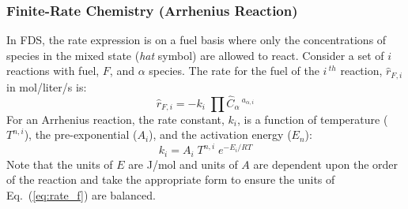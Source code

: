 \subsubsection{Finite-Rate Chemistry (Arrhenius Reaction)}
In FDS, the rate expression is on a fuel basis where only the concentrations of species in the mixed state ({\em hat} symbol) are allowed to react. Consider a set of $i$ reactions with fuel, $F$, and $\alpha$ species. The rate for the fuel of the $i\,^{th}$ reaction, $\hat{r}_{F,i}$ in mol/liter/s is:
\begin{equation}\label{eq:rate_f}
\hat{r}_{F,i}= -k_{i}\; \prod \hat{C}_{\alpha}\,^{a_{\alpha,i}}
\end{equation}
For an Arrhenius reaction, the rate constant, $k_{i}$, is a function of temperature ($T^{n,i}$), the pre-exponential ($A_{i}$), and the activation energy ($E_{n}$):
\begin{equation}\label{eq:rate_cons}
k_{i} = A_{i}\;T^{n,i}\;e^{-E_{i}/RT} 
\end{equation}
Note that the units of $E$ are J/mol and units of $A$ are dependent upon the order of the reaction and take the appropriate form to ensure the units of Eq.~(\ref{eq:rate_f}) are balanced.

